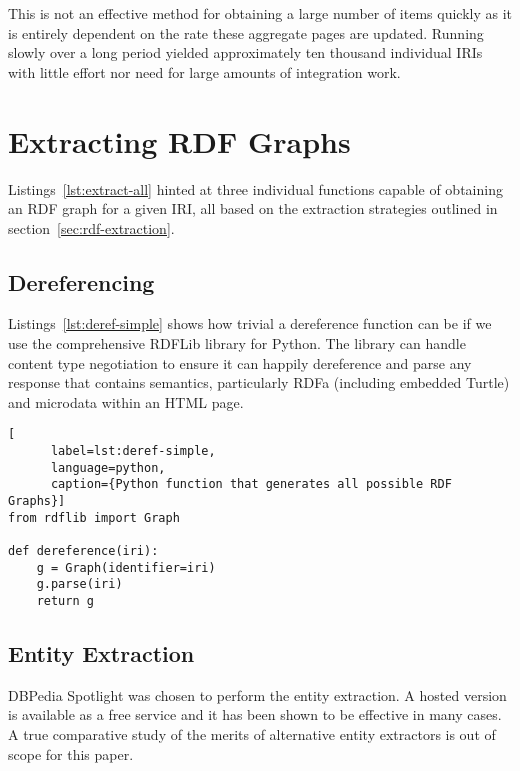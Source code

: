 This is not an effective method for obtaining a large number of items
quickly as it is entirely dependent on the rate these aggregate pages
are updated. Running slowly over a long period yielded approximately
ten thousand individual IRIs with little effort nor need for large
amounts of integration work.

\section{Extracting RDF Graphs}
\label{sec:impl-extraction}

Listings~\ref{lst:extract-all} hinted at three individual functions
capable of obtaining an RDF graph for a given IRI, all based on the
extraction strategies outlined in section~\ref{sec:rdf-extraction}.

\subsection{Dereferencing}

Listings~\ref{lst:deref-simple} shows how trivial a dereference
function can be if we use the comprehensive RDFLib library for
Python. The library can handle content type
negotiation\cite{fielding2014hypertext} to ensure it can happily
dereference and parse any response that contains semantics,
particularly RDFa (including embedded Turtle) and microdata within an
HTML page.

\begin{centering}
  \begin{lstlisting}[
      label=lst:deref-simple,
      language=python,
      caption={Python function that generates all possible RDF Graphs}]
from rdflib import Graph
    
def dereference(iri):
    g = Graph(identifier=iri)
    g.parse(iri)
    return g
  \end{lstlisting}
\end{centering}

\subsection{Entity Extraction}

DBPedia Spotlight\cite{isem2013daiber} was chosen to perform the
entity extraction. A hosted version is available as a free service and
it has been shown to be effective in many cases. A true comparative
study of the merits of alternative entity extractors is out of scope
for this paper.

